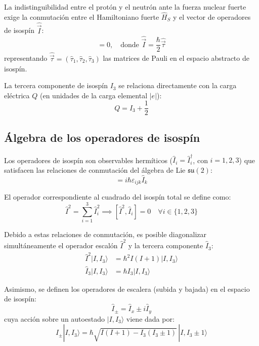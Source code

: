 La indistinguibilidad entre el protón y el neutrón ante la fuerza nuclear fuerte exige la conmutación entre el Hamiltoniano fuerte $\hat{H}_S$ y el vector de operadores de isospín $\hat{\vec{I}}$:
\begin{equation}
    [\hat{H}_S, \hat{\vec{I}}] = 0, \quad \text{donde } \hat{\vec{I}} = \frac{\hbar}{2} \hat{\vec{\tau}}
\end{equation}
representando $\hat{\vec{\tau}} = (\hat{\tau}_1, \hat{\tau}_2, \hat{\tau}_3)$ las matrices de Pauli en el espacio abstracto de isospín.

La tercera componente de isospín $I_3$ se relaciona directamente con la carga eléctrica $Q$ (en unidades de la carga elemental $|e|$):
\begin{equation}
    Q = I_3 + \frac{1}{2}
\end{equation}

\subsection{Álgebra de los operadores de isospín}

Los operadores de isospín son observables hermíticos ($\hat{I}_i = \hat{I}_i^\dagger$, con $i=1,2,3$) que satisfacen las relaciones de conmutación del álgebra de Lie $\mathfrak{su}(2)$:
\begin{equation}
    [\hat{I}_i, \hat{I}_j] = i \hbar \varepsilon_{ijk} \hat{I}_k
\end{equation}

El operador correspondiente al cuadrado del isospín total se define como:
\begin{equation}
    \hat{I}^2 = \sum_{i=1}^3 \hat{I}_i^2 \implies [\hat{I}^2, \hat{I}_i] = 0 \quad \forall i \in \{1, 2, 3\}
\end{equation}

Debido a estas relaciones de conmutación, es posible diagonalizar simultáneamente el operador escalón $\hat{I}^2$ y la tercera componente $\hat{I}_3$:
\begin{align}
    \hat{I}^2 |I, I_3\rangle &= \hbar^2 I(I+1) |I, I_3\rangle \\
    \hat{I}_3 |I, I_3\rangle &= \hbar I_3 |I, I_3\rangle
\end{align}

Asimismo, se definen los operadores de escalera (subida y bajada) en el espacio de isospín:
\begin{equation}
    \hat{I}_\pm = \hat{I}_x \pm i \hat{I}_y
\end{equation}
cuya acción sobre un autoestado $|I, I_3\rangle$ viene dada por:
\begin{equation}
    \hat{I}_\pm |I, I_3\rangle = \hbar \sqrt{I(I+1) - I_3(I_3 \pm 1)} \, |I, I_3 \pm 1\rangle
\end{equation}

